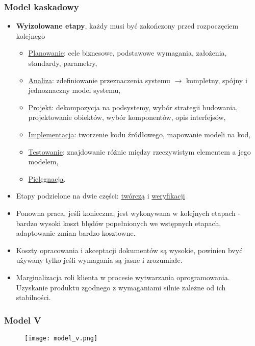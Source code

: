 \documentclass[../main.tex]{subfiles}
\begin{document}
    \subsubsection{Model kaskadowy}
    \begin{itemize}
        \item \textbf{Wyizolowane etapy}, każdy musi być zakończony przed rozpoczęciem kolejnego
        \begin{itemize}
            \item \underline{Planowanie}: cele biznesowe, podstawowe wymagania, założenia, standardy, parametry,
            \item \underline{Analiza}: zdefiniowanie przeznaczenia systemu $\rightarrow$ kompletny, spójny i jednoznaczny model systemu,
            \item \underline{Projekt}: dekompozycja na podsystemy, wybór strategii budowania, projektowanie obiektów, wybór komponentów, opis interfejsów,
            \item \underline{Implementacja}: tworzenie kodu źródłowego, mapowanie modeli na kod,
            \item \underline{Testowanie}: znajdowanie różnic między rzeczywistym elementem a jego modelem,
            \item \underline{Pielęgnacja}.
        \end{itemize}
        \item Etapy podzielone na dwie części: \underline{twórczą} i \underline{weryfikacji}
        \item Ponowna praca, jeśli konieczna, jest wykonywana w kolejnych etapach - bardzo wysoki koszt błędów
        popełnionych we wstępnych etapach, adaptowanie zmian bardzo kosztowne.
        \item Koszty opracowania i akceptacji dokumentów są wysokie, powinien bvyć używany
        tylko jeśli wymagania są jasne i zrozumiałe.
        \item Marginalizacja roli klienta w procesie wytwarzania oprogramowania. Uzyskanie produktu zgodnego z wymaganiami
        silnie zależne od ich stabilności.
    \end{itemize}

    \subsubsection{Model V}
    \begin{figure}[H]
        \texttt{[image: model\_v.png]}
    \end{figure}
\end{document}
